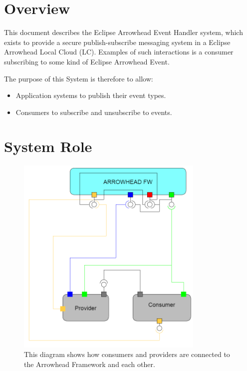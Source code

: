 \documentclass[a4paper]{arrowhead}
\begin{document}
\section{Overview}
\label{sec:overview}

This document describes the Eclipse Arrowhead  Event Handler system,
which exists to provide a secure publish-subscribe messaging system in a Eclipse Arrowhead Local Cloud (LC). Examples of such interactions is a consumer subscribing to some kind of Eclipse Arrowhead Event. 

The purpose of this System is therefore to allow:
\begin{itemize}
    \item Application systems to publish their event types.
    \item Consumers to subscribe and unsubscribe to events.
\end{itemize}


\section{System Role}
\label{sec:role}

\begin{figure}[t!]
  \centering
  \includegraphics[width=0.8\textwidth]{figures/event_handler_overview.png}
  \caption{This diagram shows how consumers and providers are connected to the Arrowhead Framework and each other.}
  \label{fig:overview}  
\end{figure}
\end{document}
